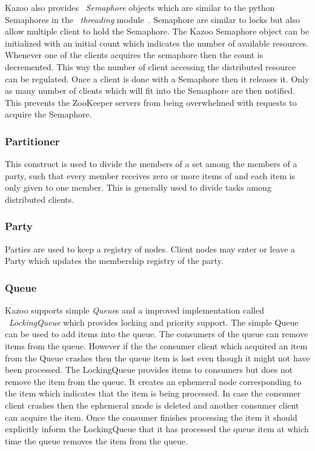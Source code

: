     Kazoo also provides ~\textit{Semaphore} objects which are similar to the python Semaphores in the ~\textit{threading} module~\cite{pythonSemaphore}. Semaphore are similar to locks but also allow multiple client to hold the Semaphore. The Kazoo Semaphore object can be initialized with an initial count which indicates the number of available resources. Whenever one of the clients acquires the semaphore then the count is decremented. This way the number of client accessing the distributed resource can be regulated. Once a client is done with a Semaphore then it releases it. Only as many number of clients which will fit into the Semaphore are then notified. This prevents the ZooKeeper servers from being overwhelmed with requests to acquire the Semaphore.
  
  \subsubsection{Partitioner}
  This construct is used to divide the members of a set among the members of a party, such that every member receives zero or more items of and each item is only given to one member. This is generally used to divide tasks among distributed clients.
  
  \subsubsection{Party}
    Parties are used to keep a registry of nodes. Client nodes may enter or leave a Party which updates the membership registry of the party.
  
  \subsubsection{Queue}
    Kazoo supports simple \textit{Queue}s and a improved implementation called ~\textit{LockingQueue} which provides locking and priority support. The simple Queue can be used to add items into the queue. The consumers of the queue can remove items from the queue. However if the the consumer client which acquired an item from the Queue crashes then the queue item is lost even though it might not have been processed. The LockingQueue provides items to consumers but does not remove the item from the queue. It creates an ephemeral node corresponding to the item which indicates that the item is being processed. In case the consumer client crashes then the ephemeral znode is deleted and another consumer client can acquire the item. Once the consumer finishes processing the item it should explicitly inform the LockingQueue that it has processed the queue item at which time the queue removes the item from the queue.
  
